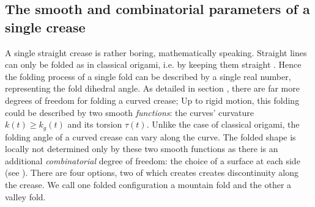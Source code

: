 \subsection{The smooth and combinatorial parameters of a single crease}
A single straight crease is rather boring, mathematically speaking. Straight lines can only be folded as in classical origami, i.e. by keeping them straight \cite{demaine_lens}. Hence the folding process of a single fold can be described by a single real number, representing the fold dihedral angle. As detailed in section , there are far more degrees of freedom for folding a curved crease; Up to rigid motion, this folding could be described by two smooth \textit{functions}: the curves' curvature $k(t) \geq k_g(t)$ and its torsion $\tau(t)$. Unlike the case of classical origami, the folding angle of a curved crease can vary along the curve. The folded shape is locally not determined only by these two smooth functions as there is an additional \textit{combinatorial} degree of freedom: the choice of a surface at each side (see ). There are four options, two of which creates creates discontinuity along the crease. We call one folded configuration a mountain fold and the other a valley fold. %




